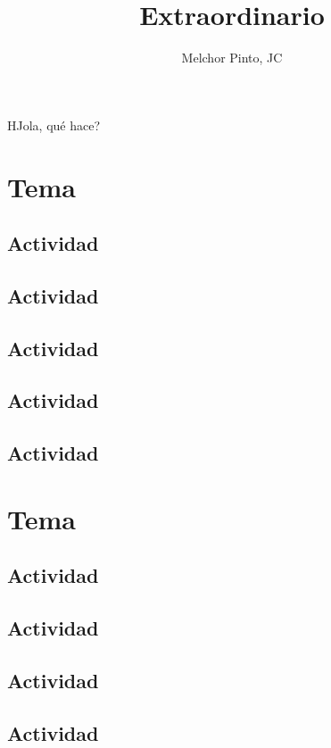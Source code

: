 \documentclass[10pt,examen]{repaso_layout}
\title{Extraordinario}
\author{Melchor Pinto, JC}
\begin{document}
    HJola, qué hace?
\begin{questions}
    \section{Tema}
    \subsection{Actividad}
    \subsection{Actividad}
    \subsection{Actividad}
    \subsection{Actividad}
    \subsection{Actividad}
        \section{Tema}
    \subsection{Actividad}
    \subsection{Actividad}
    \subsection{Actividad}
    \subsection{Actividad}

\end{questions}
\end{document}
